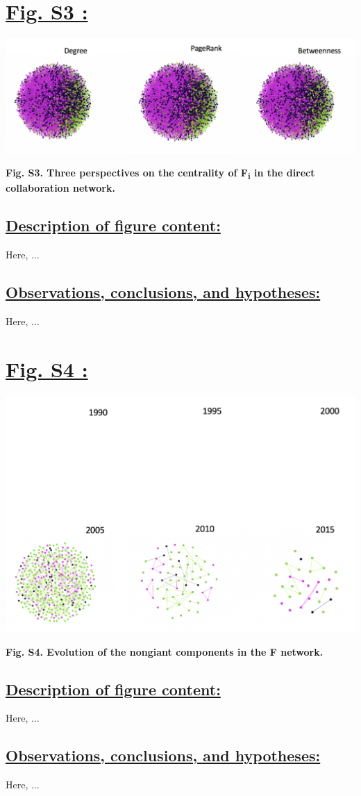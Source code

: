 \documentclass{article}\usepackage[]{graphicx}\usepackage[]{color}
\begin{document}
\newpage
\section*{\underline{Fig. S3 :}}
\begin{center}
\includegraphics[scale=0.5]{S3.png}
\newline
\par{\textbf{Fig. S3. Three perspectives on the centrality of F\textsubscript{i} in the direct collaboration network.}}
\end{center}
\subsection*{\underline{Description of figure content:}}
\par{Here, ...}
\subsection*{\underline{Observations, conclusions, and hypotheses:}}
\par{Here, ...}

\newpage
\section*{\underline{Fig. S4 :}}
\begin{center}
\includegraphics[scale=0.6]{S4.png}
\newline
\par{\textbf{Fig. S4. Evolution of the nongiant components in the F network.}}
\end{center}
\subsection*{\underline{Description of figure content:}}
\par{Here, ...}
\subsection*{\underline{Observations, conclusions, and hypotheses:}}
\par{Here, ...}
\end{document}
